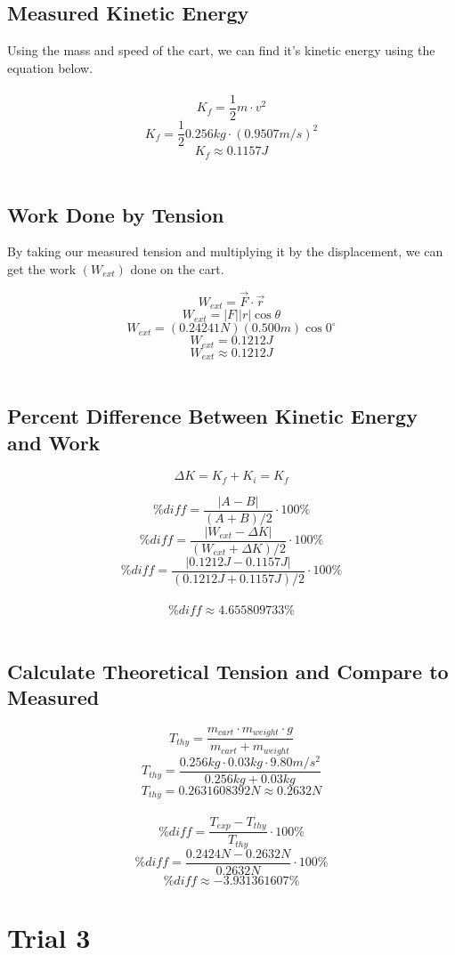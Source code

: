 \documentclass[11pt, letterpaper, includehead]{article}
\begin{document}
\subsection{Measured Kinetic Energy}
Using the mass and speed of the cart, we can find it's kinetic energy using
the equation below.\\\\
$$K_f = \frac{1}{2}m\cdot v^2$$
$$K_f = \frac{1}{2}0.256kg\cdot (0.9507m/s)^2$$
$$K_f \approx 0.1157J$$\\

\subsection{Work Done by Tension}
By taking our measured tension and multiplying it by the displacement,
we can get the work $(W_{ext})$ done on the cart.

$$W_{ext} = \vec{F}\cdot \vec{r}$$
$$W_{ext} = |F||r|\cos\theta$$
$$W_{ext} = (0.24241N)(0.500m)\cos0^{\circ}$$
$$W_{ext} = 0.1212J$$
$$W_{ext} \approx 0.1212J$$\\

\subsection{Percent Difference Between Kinetic Energy and Work}
$$\Delta K = K_f + K_i = K_f$$

$$\%diff = \frac{|A - B|}{(A + B) / 2}\cdot 100\%$$
$$\%diff = \frac{|W_{ext} - \Delta K|}{(W_{ext} + \Delta K) / 2}\cdot 100\%$$
$$\%diff = \frac{|0.1212J - 0.1157J|}{(0.1212J + 0.1157J) / 2}\cdot 100\%$$\\
$$\%diff \approx \boxed{4.655809733\%}$$\\

\subsection{Calculate Theoretical Tension and Compare to Measured}
$$T_{thy} = \frac{m_{cart}\cdot m_{weight}\cdot g}{m_{cart} + m_{weight}}$$
$$T_{thy} = \frac{0.256kg\cdot 0.03kg\cdot 9.80m/s^2}{0.256kg + 0.03kg}$$
$$T_{thy} = 0.2631608392N \approx \boxed{0.2632N}$$\\

$$\%diff = \frac{T_{exp} - T_{thy}}{T_{thy}}\cdot 100\%$$
$$\%diff = \frac{0.2424N - 0.2632N}{0.2632N}\cdot 100\%$$
$$\%diff \approx \boxed{-3.931361607\%}$$

\section{Trial 3} %
\end{document}

